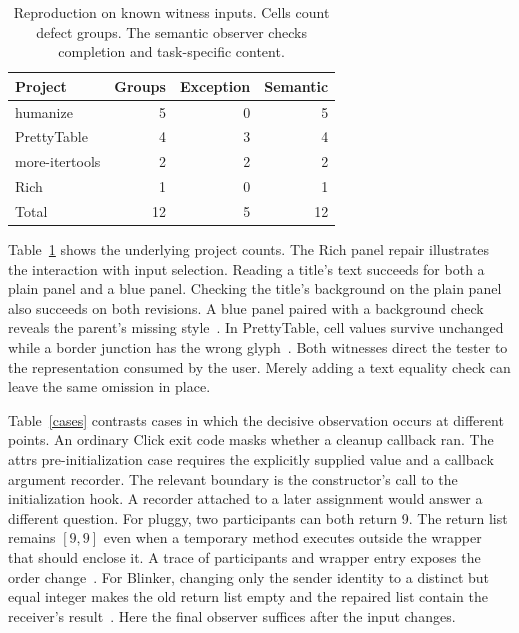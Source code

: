 \documentclass[conference]{IEEEtran}
\begin{document}
\begin{table}[t]
\centering\small
\caption{Reproduction on known witness inputs. Cells count defect groups. The semantic observer checks completion and task-specific content.}\label{known}
\begin{tabular}{lrrr}\hline
Project & Groups & Exception & Semantic\\\hline
humanize & 5 & 0 & 5\\
PrettyTable & 4 & 3 & 4\\
more-itertools & 2 & 2 & 2\\
Rich & 1 & 0 & 1\\\hline
Total & 12 & 5 & 12\\\hline
\end{tabular}
\end{table}
Table~\ref{known} shows the underlying project counts. The Rich panel repair illustrates the interaction with input selection. Reading a title's text succeeds for both a plain panel and a blue panel. Checking the title's background on the plain panel also succeeds on both revisions. A blue panel paired with a background check reveals the parent's missing style~\cite{rich}. In PrettyTable, cell values survive unchanged while a border junction has the wrong glyph~\cite{pretty}. Both witnesses direct the tester to the representation consumed by the user. Merely adding a text equality check can leave the same omission in place.

Table~\ref{cases} contrasts cases in which the decisive observation occurs at different points. An ordinary Click exit code masks whether a cleanup callback ran. The attrs pre-initialization case requires the explicitly supplied value and a callback argument recorder. The relevant boundary is the constructor's call to the initialization hook. A recorder attached to a later assignment would answer a different question. For pluggy, two participants can both return 9. The return list remains $[9,9]$ even when a temporary method executes outside the wrapper that should enclose it. A trace of participants and wrapper entry exposes the order change~\cite{click,plugfix}. For Blinker, changing only the sender identity to a distinct but equal integer makes the old return list empty and the repaired list contain the receiver's result~\cite{blinkfix}. Here the final observer suffices after the input changes.
\end{document}
